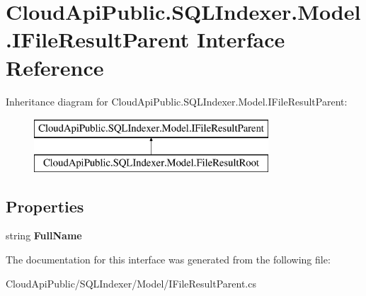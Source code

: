 \hypertarget{interface_cloud_api_public_1_1_s_q_l_indexer_1_1_model_1_1_i_file_result_parent}{\section{Cloud\-Api\-Public.\-S\-Q\-L\-Indexer.\-Model.\-I\-File\-Result\-Parent Interface Reference}
\label{interface_cloud_api_public_1_1_s_q_l_indexer_1_1_model_1_1_i_file_result_parent}
}
Inheritance diagram for Cloud\-Api\-Public.\-S\-Q\-L\-Indexer.\-Model.\-I\-File\-Result\-Parent\-:\begin{figure}[H]
\begin{center}
\leavevmode
\includegraphics[height=2.000000cm]{interface_cloud_api_public_1_1_s_q_l_indexer_1_1_model_1_1_i_file_result_parent}
\end{center}
\end{figure}
\subsection*{Properties}
\begin{DoxyCompactItemize}
\item 
\hypertarget{interface_cloud_api_public_1_1_s_q_l_indexer_1_1_model_1_1_i_file_result_parent_ac669fe7d327ece80c505e34f96ab1699}{string {\bfseries Full\-Name}}\label{interface_cloud_api_public_1_1_s_q_l_indexer_1_1_model_1_1_i_file_result_parent_ac669fe7d327ece80c505e34f96ab1699}

\end{DoxyCompactItemize}


The documentation for this interface was generated from the following file\-:\begin{DoxyCompactItemize}
\item 
Cloud\-Api\-Public/\-S\-Q\-L\-Indexer/\-Model/I\-File\-Result\-Parent.\-cs\end{DoxyCompactItemize}
